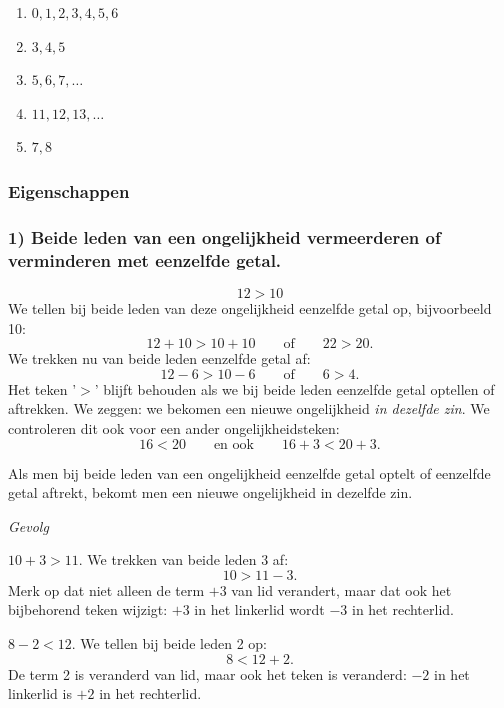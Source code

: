 \documentclass{bis}
\begin{document}
\begin{solution}
\begin{enumerate}
  \item $0,1,2,3,4,5,6$
  \item $3,4,5$
  \item $5,6,7,\ldots$
  \item $11,12,13,\ldots$
  \item $7,8$
\end{enumerate}
\end{solution}

\subsubsection{Eigenschappen}

\subsubsection*{1) Beide leden van een ongelijkheid vermeerderen of verminderen met eenzelfde getal.}
\[12>10\]
We tellen bij beide leden van deze ongelijkheid eenzelfde getal op, bijvoorbeeld 10:
\[12+10>10+10\qquad\text{of}\qquad22>20.\]
We trekken nu van beide leden eenzelfde getal af:
\[12-6>10-6\qquad\text{of}\qquad6>4.\]
Het teken '$>$' blijft behouden als we bij beide leden eenzelfde getal optellen of aftrekken. We
zeggen: we bekomen een nieuwe ongelijkheid \emph{in dezelfde zin}. We controleren dit ook voor
een ander ongelijkheidsteken:
\[16<20\qquad\text{en ook}\qquad16+3<20+3.\]
\begin{onthoud}
Als men bij beide leden van een ongelijkheid eenzelfde getal optelt of eenzelfde getal aftrekt,
bekomt men een nieuwe ongelijkheid in dezelfde zin.
\end{onthoud}

\textit{Gevolg}

\begin{voorbeeld}
$10+3>11$. We trekken van beide leden 3 af:
\[10>11-3.\]
Merk op dat niet alleen de term $+3$ van lid verandert, maar dat ook het bijbehorend teken
wijzigt: $+3$ in het linkerlid wordt $-3$ in het rechterlid.
\end{voorbeeld}

\begin{voorbeeld}
$8-2<12$. We tellen bij beide leden 2 op:
\[8<12+2.\]
De term 2 is veranderd van lid, maar ook het teken is veranderd: $-2$ in het linkerlid is $+2$
in het rechterlid.
\end{voorbeeld}
\end{document}
